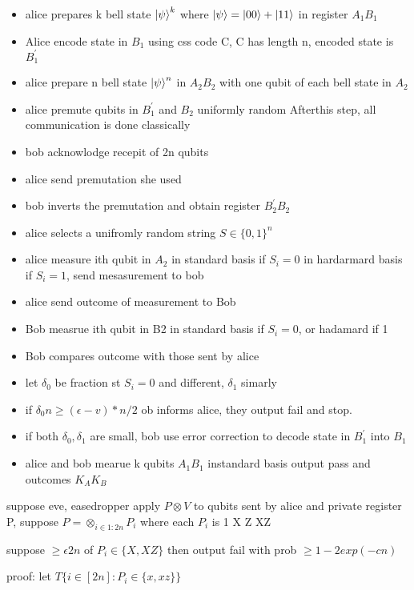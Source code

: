 \documentclass[10pt]{article}
\theoremstyle{break}
\begin{document}
    \begin{itemize}
        \item alice prepares k bell state $\ket{\psi}^k$ where $\ket{\psi}=\ket{00}+\ket{11}$ in register $A_1B_1$
        \item Alice encode state in $B_1$ using css code C, C has length n, encoded state is $B^\prime_1$
        \item alice prepare n bell state $\ket{\psi}^n$ in $A_2B_2$ with one qubit of each bell state in $A_2$  
        \item alice premute qubits in $B_1^\prime$ and $B_2$ uniformly random  Afterthis step, all communication is done classically
        \item bob acknowlodge recepit of 2n qubits 
        \item alice send premutation she used 
        \item bob inverts the premutation and obtain register $B_2^\prime B_2$
        \item alice selects  a unifromly random string $S\in\{0,1\}^n$ 
        \item alice measure ith qubit in $A_2$ in standard basis if $S_i=0$ in hardarmard basis if $S_i=1$, send mesasurement to bob
            
        \item alice send outcome of measurement to Bob 
        \item Bob measrue ith qubit in B2 in standard basis if $S_i=0$, or hadamard if 1 
        \item Bob compares outcome with those sent by alice 
        \item let $\delta_0$ be fraction st $S_i=0$ and different, $\delta_1$ simarly 
        \item if $\delta_0n \geq (\epsilon-v)*n/2$ ob informs alice, they output fail and stop. 
        \item  if both $\delta_0,\delta_1$ are small, bob use error correction to decode state in $B_1^\prime$ into $B_1$
        \item  alice and bob mearue k qubits $A_1 B_1$ instandard basis output pass and outcomes $K_A K_B$
    \end{itemize}

    suppose eve, easedropper apply $P\otimes V$ to qubits sent by alice and private register P, 
    suppose $P=\otimes_{i\in 1:2n}P_i$ where each $P_i$ is 1 X Z XZ

    suppose $\geq \epsilon 2n$ of $P_i\in \{X,XZ\}$ then output fail with prob $\geq 1-2exp(-cn)$

    proof: let $T\{i\in[2n]:P_i\in\{x,xz\}\}$
\end{document}
